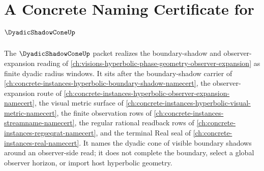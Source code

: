 \chapter{A Concrete Naming Certificate for $\DyadicShadowConeUp$}
\label{ch:concrete-instances-dyadic-shadow-cone-namecert}

The $\DyadicShadowConeUp$ packet realizes the boundary-shadow and observer-expansion reading of \autoref{ch:visions-hyperbolic-phase-geometry-observer-expansion} as finite dyadic radius windows. It sits after the boundary-shadow carrier of \autoref{ch:concrete-instances-hyperbolic-boundary-shadow-namecert}, the observer-expansion route of \autoref{ch:concrete-instances-hyperbolic-observer-expansion-namecert}, the visual metric surface of \autoref{ch:concrete-instances-hyperbolic-visual-metric-namecert}, the finite observation rows of \autoref{ch:concrete-instances-streamname-namecert}, the regular rational readback rows of \autoref{ch:concrete-instances-regseqrat-namecert}, and the terminal Real seal of \autoref{ch:concrete-instances-real-namecert}. It names the dyadic cone of visible boundary shadows around an observer-side read; it does not complete the boundary, select a global observer horizon, or import host hyperbolic geometry.

